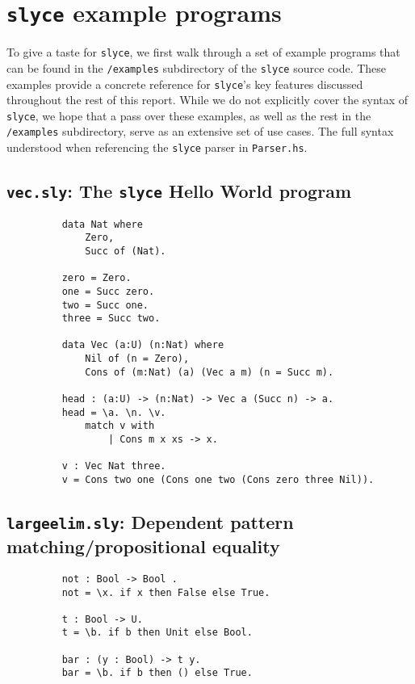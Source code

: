 \section{\texttt{slyce} example programs}
To give a taste for \texttt{slyce}, we first walk through a set of example programs that can be found in the \texttt{/examples} subdirectory of the \texttt{slyce} source code.
These examples provide a concrete reference for \texttt{slyce}'s key features discussed throughout the rest of this report.
While we do not explicitly cover the syntax of \texttt{slyce}, we hope that a pass over these examples, as well as the rest in the \texttt{/examples} subdirectory, serve as an extensive set of use cases.
The full syntax understood when referencing the \texttt{slyce} parser in \texttt{Parser.hs}.
 
\subsection{\texttt{vec.sly}: The \texttt{slyce} Hello World program}
\begin{figure}[h!]
\begin{lstlisting}
    data Nat where
        Zero,
        Succ of (Nat).

    zero = Zero.
    one = Succ zero.
    two = Succ one.
    three = Succ two.

    data Vec (a:U) (n:Nat) where
        Nil of (n = Zero),
        Cons of (m:Nat) (a) (Vec a m) (n = Succ m).

    head : (a:U) -> (n:Nat) -> Vec a (Succ n) -> a.
    head = \a. \n. \v.
        match v with
            | Cons m x xs -> x.

    v : Vec Nat three.
    v = Cons two one (Cons one two (Cons zero three Nil)).
\end{lstlisting}
\end{figure}

\subsection{\texttt{largeelim.sly}: Dependent pattern matching/propositional equality}
\begin{figure}[h!]
\begin{lstlisting}
    not : Bool -> Bool .
    not = \x. if x then False else True.
    
    t : Bool -> U.
    t = \b. if b then Unit else Bool.
    
    bar : (y : Bool) -> t y.
    bar = \b. if b then () else True.    
\end{lstlisting}
\end{figure}
